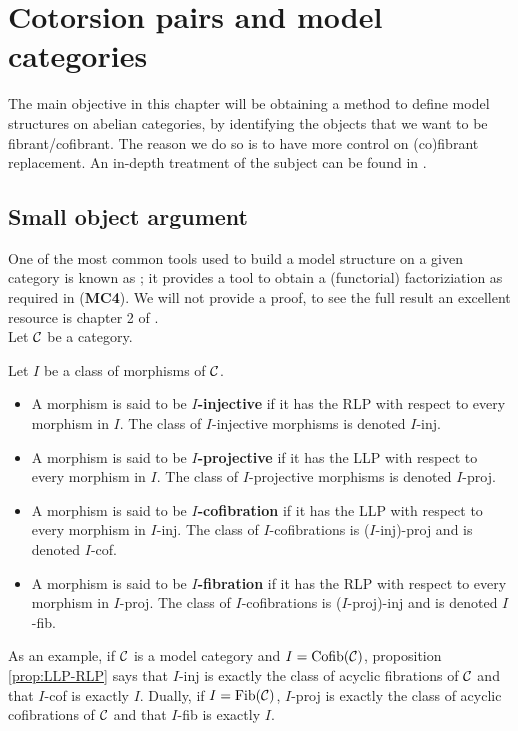 \chapter{Cotorsion pairs and model categories}
The main objective in this chapter will be obtaining a method to define model structures on abelian categories, by identifying the objects that we want to be fibrant/cofibrant. The reason we do so is to have more control on (co)fibrant replacement.
An in-depth treatment of the subject can be found in \cite{bullones2016introduction}.

\section{Small object argument}
One of the most common tools used to build a model structure on a given category is known as ; it provides a tool to obtain a (functorial) factoriziation as required in (\textbf{MC4}). We will not provide a proof, to see the full result an excellent resource is chapter 2 of \cite{hovey2007model}.\\
Let $\mathcal{C}$ be a category.

\begin{definition}
	Let $I$ be a class of morphisms of $\mathcal{C}$. 
	\begin{itemize}
		\item A morphism is said to be $I$\textbf{-injective} if it has the RLP with respect to every morphism in $I$. The class of $I$-injective morphisms is denoted $I$-inj.
		\item A morphism is said to be $I$\textbf{-projective} if it has the LLP with respect to every morphism in $I$. The class of $I$-projective morphisms is denoted $I$-proj.
		\item A morphism is said to be $I$\textbf{-cofibration} if it has the LLP with respect to every morphism in $I$-inj. The class of $I$-cofibrations is ($I$-inj)-proj and is denoted $I$-cof.
		\item A morphism is said to be $I$\textbf{-fibration} if it has the RLP with respect to every morphism in $I$-proj. The class of $I$-cofibrations is ($I$-proj)-inj and is denoted $I$-fib.
	\end{itemize}
\end{definition}

As an example, if $\mathcal{C}$ is a model category and $I = \mathrm{Cofib}(\mathcal{C})$, proposition \ref{prop:LLP-RLP} says that $I$-inj is exactly the class of acyclic fibrations of $\mathcal{C}$ and that $I$-cof is exactly $I$. Dually, if $I = \mathrm{Fib}(\mathcal{C})$, $I$-proj is exactly the class of acyclic cofibrations of $\mathcal{C}$ and that $I$-fib is exactly $I$.

